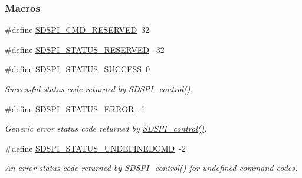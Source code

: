\subsubsection*{Macros}
\begin{DoxyCompactItemize}
\item 
\#define \hyperlink{group___s_d_s_p_i___c_o_n_t_r_o_l_ga2912b6627b0f64de874048a5ebea2a85}{S\+D\+S\+P\+I\+\_\+\+C\+M\+D\+\_\+\+R\+E\+S\+E\+R\+V\+E\+D}~32
\item 
\#define \hyperlink{group___s_d_s_p_i___c_o_n_t_r_o_l_ga3037f55e94a7ef536986738c721a690a}{S\+D\+S\+P\+I\+\_\+\+S\+T\+A\+T\+U\+S\+\_\+\+R\+E\+S\+E\+R\+V\+E\+D}~-\/32
\item 
\#define \hyperlink{group___s_d_s_p_i___s_t_a_t_u_s_ga5ebecb6ddc00b47b11c1d5ab3ce04108}{S\+D\+S\+P\+I\+\_\+\+S\+T\+A\+T\+U\+S\+\_\+\+S\+U\+C\+C\+E\+S\+S}~0
\begin{DoxyCompactList}\small\item\em Successful status code returned by \hyperlink{_s_d_s_p_i_8h_a541a1db109382fe090ed7a9209a34f61}{S\+D\+S\+P\+I\+\_\+control()}. \end{DoxyCompactList}\item 
\#define \hyperlink{group___s_d_s_p_i___s_t_a_t_u_s_ga61e58103fc719d0afafddfc7dd11b49d}{S\+D\+S\+P\+I\+\_\+\+S\+T\+A\+T\+U\+S\+\_\+\+E\+R\+R\+O\+R}~-\/1
\begin{DoxyCompactList}\small\item\em Generic error status code returned by \hyperlink{_s_d_s_p_i_8h_a541a1db109382fe090ed7a9209a34f61}{S\+D\+S\+P\+I\+\_\+control()}. \end{DoxyCompactList}\item 
\#define \hyperlink{group___s_d_s_p_i___s_t_a_t_u_s_gaf65a39f487c0da299c3e0fc77a70a4c3}{S\+D\+S\+P\+I\+\_\+\+S\+T\+A\+T\+U\+S\+\_\+\+U\+N\+D\+E\+F\+I\+N\+E\+D\+C\+M\+D}~-\/2
\begin{DoxyCompactList}\small\item\em An error status code returned by \hyperlink{_s_d_s_p_i_8h_a541a1db109382fe090ed7a9209a34f61}{S\+D\+S\+P\+I\+\_\+control()} for undefined command codes. \end{DoxyCompactList}\end{DoxyCompactItemize}
